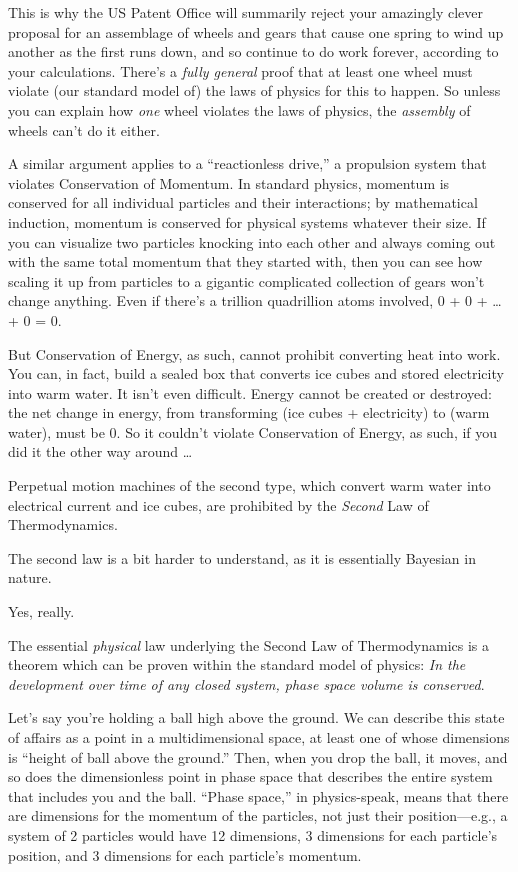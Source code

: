 {
 This is why the US Patent Office will summarily reject your
amazingly clever proposal for an assemblage of wheels and gears that
cause one spring to wind up another as the first runs down, and so
continue to do work forever, according to your calculations.
There's a \textit{fully general} proof that at least
one wheel must violate (our standard model of) the laws of physics for
this to happen. So unless you can explain how \textit{one} wheel
violates the laws of physics, the \textit{assembly} of wheels
can't do it either.}

{
 A similar argument applies to a ``reactionless
drive,'' a propulsion system that violates
Conservation of Momentum. In standard physics, momentum is conserved
for all individual particles and their interactions; by mathematical
induction, momentum is conserved for physical systems whatever their
size. If you can visualize two particles knocking into each other and
always coming out with the same total momentum that they started with,
then you can see how scaling it up from particles to a gigantic
complicated collection of gears won't change anything.
Even if there's a trillion quadrillion atoms involved,
0 + 0 + {\dots} + 0 = 0.}

{
 But Conservation of Energy, as such, cannot prohibit converting
heat into work. You can, in fact, build a sealed box that converts ice
cubes and stored electricity into warm water. It isn't
even difficult. Energy cannot be created or destroyed: the net change
in energy, from transforming (ice cubes + electricity) to (warm water),
must be 0. So it couldn't violate Conservation of
Energy, as such, if you did it the other way around \ldots}

{
 Perpetual motion machines of the second type, which convert warm
water into electrical current and ice cubes, are prohibited by the
\textit{Second} Law of Thermodynamics.}

{
 The second law is a bit harder to understand, as it is essentially
Bayesian in nature.}

{
 Yes, really.}

{
 The essential \textit{physical} law underlying the Second Law of
Thermodynamics is a theorem which can be proven within the standard
model of physics: \textit{In the development over time of any closed
system, phase space volume is conserved}.}

{
 Let's say you're holding a ball
high above the ground. We can describe this state of affairs as a point
in a multidimensional space, at least one of whose dimensions is
``height of ball above the ground.''
Then, when you drop the ball, it moves, and so does the dimensionless
point in phase space that describes the entire system that includes you
and the ball. ``Phase space,'' in
physics-speak, means that there are dimensions for the momentum of the
particles, not just their position---e.g., a system of 2 particles
would have 12 dimensions, 3 dimensions for each
particle's position, and 3 dimensions for each
particle's momentum.}

